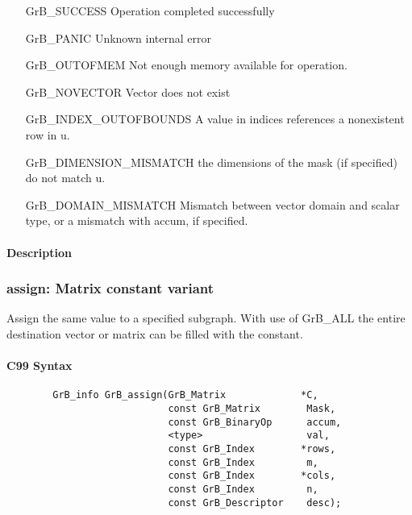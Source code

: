 \begin{itemize}[leftmargin=2.1in]
\item[{\sf GrB\_SUCCESS}]             Operation completed successfully
\item[{\sf GrB\_PANIC}]               Unknown internal error
\item[{\sf GrB\_OUTOFMEM}]            Not enough memory available for operation.
\item[{\sf GrB\_NOVECTOR}]            Vector does not exist
\item[{\sf GrB\_INDEX\_OUTOFBOUNDS}]
        A value in indices references a nonexistent row in {\sf u}.
\item[{\sf GrB\_DIMENSION\_MISMATCH}] 
        the dimensions of the mask (if specified) do not match {\sf u}.
\item[{\sf GrB\_DOMAIN\_MISMATCH}]    Mismatch between vector domain and scalar type,
                                      or a mismatch with {\sf accum}, if specified.
\end{itemize}


\paragraph{Description}

\subsubsection{{\sf assign}: Matrix constant variant}

Assign the same value to a specified subgraph.  With use of {\sf GrB\_ALL} the entire
destination vector or matrix can be filled with the constant.

\paragraph{C99 Syntax}

\begin{verbatim}
        GrB_info GrB_assign(GrB_Matrix             *C,
                            const GrB_Matrix        Mask,
                            const GrB_BinaryOp      accum,
                            <type>                  val,
                            const GrB_Index        *rows,
                            const GrB_Index         m,
                            const GrB_Index        *cols,
                            const GrB_Index         n,
                            const GrB_Descriptor    desc);
\end{verbatim}

